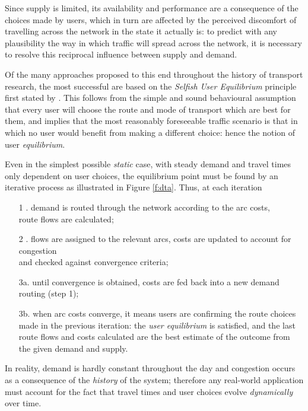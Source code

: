 Since supply is limited, its availability and performance are a consequence of the choices made by users, which in turn are affected by the perceived discomfort of travelling across the network in the state it actually is: to predict with any plausibility the way in which traffic will spread across the network, it is necessary to resolve this reciprocal influence between supply and demand.

Of the many approaches proposed to this end throughout the history of transport research, the most successful are based on the \emph{Selfish User Equilibrium} principle first stated by \cite{wardrop1952}. This follows from the simple and sound behavioural assumption that every user will choose the route and mode of transport which are best for them, and implies that the most reasonably foreseeable traffic scenario is that in which no user would benefit from making a different choice: hence the notion of user \emph{equilibrium}.


Even in the simplest possible \emph{static} case, with steady demand and travel times only dependent on user choices, the equilibrium point must be found by an iterative process as illustrated in Figure \ref{f:dta}. Thus, at each iteration 
\begin{enumerate}
\item[1 .] demand is routed through the network according to the arc costs, \\
route flows are calculated;
\item[2 .] flows are assigned to the relevant arcs, costs are updated to account for congestion\\ and checked against convergence criteria;
\item[3a.] until convergence is obtained, costs are fed back into a new demand routing (step 1);
\item[3b.] when arc costs converge, it means users are confirming the route choices made in the previous iteration: the \emph{user equilibrium} is satisfied, and the last route flows and costs calculated are the best estimate of the outcome from the given demand and supply.
\end{enumerate} 

In reality, demand is hardly constant throughout the day and congestion occurs as a consequence of the \emph{history} of the system; therefore any real-world application must account for the fact that travel times and user choices evolve \emph{dynamically} over time.

